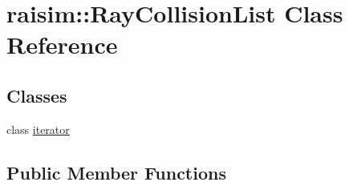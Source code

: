 \hypertarget{classraisim_1_1RayCollisionList}{}\section{raisim\+:\+:Ray\+Collision\+List Class Reference}
\label{classraisim_1_1RayCollisionList}
\subsection*{Classes}
\begin{DoxyCompactItemize}
\item 
class \hyperlink{classraisim_1_1RayCollisionList_1_1iterator}{iterator}
\end{DoxyCompactItemize}
\subsection*{Public Member Functions}

